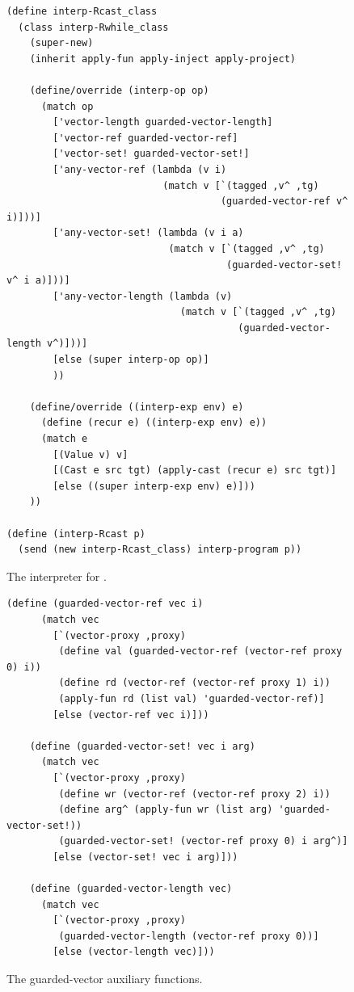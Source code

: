 \documentclass[7x10,nocrop]{TimesAPriori_MIT}%
\begin{document}
\begin{figure}[tbp]
\begin{lstlisting}[basicstyle=\ttfamily\footnotesize]
(define interp-Rcast_class
  (class interp-Rwhile_class
    (super-new)
    (inherit apply-fun apply-inject apply-project)

    (define/override (interp-op op)
      (match op
        ['vector-length guarded-vector-length]
        ['vector-ref guarded-vector-ref]
        ['vector-set! guarded-vector-set!]
        ['any-vector-ref (lambda (v i)
                           (match v [`(tagged ,v^ ,tg)
                                     (guarded-vector-ref v^ i)]))]
        ['any-vector-set! (lambda (v i a)
                            (match v [`(tagged ,v^ ,tg)
                                      (guarded-vector-set! v^ i a)]))]
        ['any-vector-length (lambda (v)
                              (match v [`(tagged ,v^ ,tg)
                                        (guarded-vector-length v^)]))]
        [else (super interp-op op)]
        ))

    (define/override ((interp-exp env) e)
      (define (recur e) ((interp-exp env) e))
      (match e
        [(Value v) v]
        [(Cast e src tgt) (apply-cast (recur e) src tgt)]
        [else ((super interp-exp env) e)]))
    ))

(define (interp-Rcast p)
  (send (new interp-Rcast_class) interp-program p))
\end{lstlisting}
\caption{The interpreter for \LangCast{}.}
  \label{fig:interp-Rcast}
\end{figure}


\begin{figure}[tbp]
\begin{lstlisting}[basicstyle=\ttfamily\footnotesize]
    (define (guarded-vector-ref vec i)
      (match vec
        [`(vector-proxy ,proxy)
         (define val (guarded-vector-ref (vector-ref proxy 0) i))
         (define rd (vector-ref (vector-ref proxy 1) i))
         (apply-fun rd (list val) 'guarded-vector-ref)]
        [else (vector-ref vec i)]))
        
    (define (guarded-vector-set! vec i arg)
      (match vec
        [`(vector-proxy ,proxy)
         (define wr (vector-ref (vector-ref proxy 2) i))
         (define arg^ (apply-fun wr (list arg) 'guarded-vector-set!))
         (guarded-vector-set! (vector-ref proxy 0) i arg^)]
        [else (vector-set! vec i arg)]))
        
    (define (guarded-vector-length vec)
      (match vec
        [`(vector-proxy ,proxy)
         (guarded-vector-length (vector-ref proxy 0))]
        [else (vector-length vec)]))
\end{lstlisting}
\caption{The guarded-vector auxiliary functions.}
  \label{fig:guarded-vector}
\end{figure}
\end{document}
